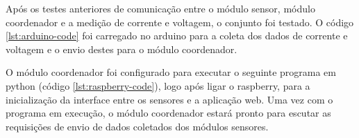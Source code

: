 Após os testes anteriores de comunicação entre o módulo sensor, módulo coordenador e a medição de corrente e voltagem, o conjunto foi testado. O código \ref{lst:arduino-code} foi carregado no arduino para a coleta dos dados de corrente e voltagem e o envio destes para o módulo coordenador.



O módulo coordenador foi configurado para executar o seguinte programa em python (código \ref{lst:raspberry-code}), logo após ligar o raspberry, para a inicialização da interface entre os sensores e a aplicação web. Uma vez com o programa em execução, o módulo coordenador estará pronto para escutar as requisições de envio de dados coletados dos módulos sensores. 



